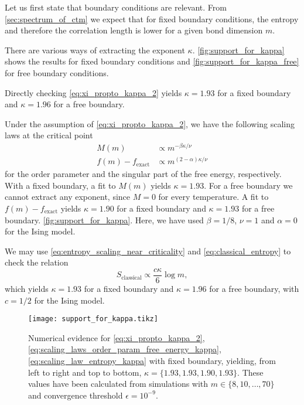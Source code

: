 Let us first state that boundary conditions are relevant.
From \autoref{sec:spectrum_of_ctm} we expect that for fixed boundary conditions,
the entropy and therefore the correlation length is lower for a given bond dimension $m$.

There are various ways of extracting the exponent $\kappa$.
\autoref{fig:support_for_kappa} shows the results for fixed boundary conditions and \autoref{fig:support_for_kappa_free}
for free boundary conditions.

Directly checking \autoref{eq:xi_propto_kappa_2} yields $\kappa = 1.93$ for a fixed boundary
and $\kappa = 1.96$ for a free boundary.

Under the assumption of \autoref{eq:xi_propto_kappa_2}, we have the following scaling laws at the critical point
\begin{align}\label{eq:scaling_laws_order_param_free_energy_kappa}
  M(m) & \propto m^{-\beta \kappa / \nu} \\
  f(m) - f_{\text{exact}} & \propto m^{(2-\alpha)\kappa / \nu}
\end{align}
for the order parameter and the singular part of the free energy, respectively.
With a fixed boundary, a fit to $M(m)$ yields $\kappa = 1.93$.
For a free boundary we cannot extract any exponent, since $M = 0$ for every temperature.
A fit to $f(m) - f_{\text{exact}}$ yields $\kappa = 1.90$ for a fixed boundary and $\kappa = 1.93$ for a free boundary.
\autoref{fig:support_for_kappa}. Here, we have used $\beta = 1/8$, $\nu = 1$ and $\alpha = 0$ for the Ising model.

We may use \autoref{eq:entropy_scaling_near_criticality} and \autoref{eq:classical_entropy} to check the
relation
\begin{equation}\label{eq:scaling_law_entropy_kappa}
  S_{\text{classical}} \propto \frac{c\kappa}{6}\log m,
\end{equation}
which yields $\kappa = 1.93$ for a fixed boundary and $\kappa = 1.96$ for a free boundary,
with $c = 1/2$ for the Ising model.

\begin{figure}
  \texttt{[image: support\_for\_kappa.tikz]}
  \caption{Numerical evidence for \autoref{eq:xi_propto_kappa_2}, \autoref{eq:scaling_laws_order_param_free_energy_kappa},
  \autoref{eq:scaling_law_entropy_kappa} with fixed boundary, yielding, from left to right and top to bottom, $\kappa = \{ 1.93, 1.93, 1.90,
  1.93 \}$. These values have been calculated from simulations with $m \in \{8, 10, \dots, 70\} $ and convergence threshold $\epsilon = 10^{-9}$. }\label{fig:support_for_kappa}
\end{figure}

